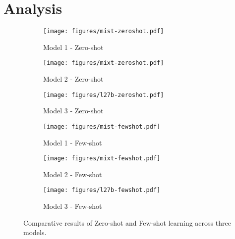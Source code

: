 \section{Analysis}

\begin{figure*}
    \centering
    \begin{subfigure}{0.32\textwidth}
        \texttt{[image: figures/mist-zeroshot.pdf]}
        \caption{Model 1 - Zero-shot}
        \label{fig:model1_zero}
    \end{subfigure}
    \hfill
    \begin{subfigure}{0.32\textwidth}
        \texttt{[image: figures/mixt-zeroshot.pdf]}
        \caption{Model 2 - Zero-shot}
        \label{fig:model2_zero}
    \end{subfigure}
    \hfill
    \begin{subfigure}{0.32\textwidth}
        \texttt{[image: figures/l27b-zeroshot.pdf]}
        \caption{Model 3 - Zero-shot}
        \label{fig:model3_zero}
    \end{subfigure}
    \hfill
    \begin{subfigure}{0.32\textwidth}
        \texttt{[image: figures/mist-fewshot.pdf]}
        \caption{Model 1 - Few-shot}
        \label{fig:model1_few}
    \end{subfigure}
    \hfill
    \begin{subfigure}{0.32\textwidth}
        \texttt{[image: figures/mixt-fewshot.pdf]}
        \caption{Model 2 - Few-shot}
        \label{fig:model2_few}
    \end{subfigure}
    \hfill
    \begin{subfigure}{0.32\textwidth}
        \texttt{[image: figures/l27b-fewshot.pdf]}
        \caption{Model 3 - Few-shot}
        \label{fig:model3_few}
    \end{subfigure}
    \hfill
    \caption{Comparative results of Zero-shot and Few-shot learning across three models.}
    \label{fig:gains}
\end{figure*}

